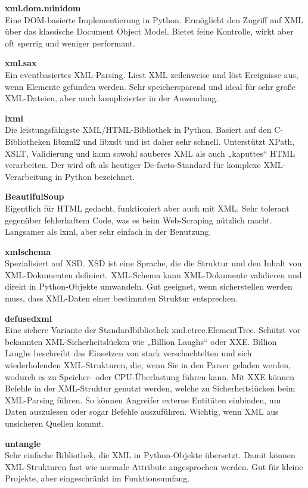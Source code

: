 \textbf{xml.dom.minidom}\\
Eine DOM-basierte Implementierung in Python.
Ermöglicht den Zugriff auf XML über das klassische Document Object Model.
Bietet feine Kontrolle, wirkt aber oft sperrig und weniger performant. \cite*{xml.dom.minidom}

\textbf{xml.sax}\\
Ein eventbasiertes XML-Parsing.
Liest XML zeilenweise und löst Ereignisse aus, wenn Elemente gefunden werden.
Sehr speichersparend und ideal für sehr große XML-Dateien, aber auch komplizierter in der Anwendung. \cite*{xml.sax}

\textbf{lxml}\\
Die leistungsfähigste XML/HTML-Bibliothek in Python.
Basiert auf den C-Bibliotheken libxml2 und libxslt und ist daher sehr schnell.
Unterstützt XPath, \ac{XSLT}, Validierung und kann sowohl sauberes XML als auch „kaputtes“ \ac{HTML} verarbeiten.
Der wird oft als heutiger De-facto-Standard für komplexe XML-Verarbeitung in Python bezeichnet. \cite*{lxml}

\textbf{BeautifulSoup}\\
Eigentlich für HTML gedacht, funktioniert aber auch mit XML. Sehr tolerant gegenüber fehlerhaftem Code, was es beim Web-Scraping nützlich macht.
Langsamer als lxml, aber sehr einfach in der Benutzung. \cite*{BeautifulSoup}

\textbf{xmlschema}\\
Spezialisiert auf \ac{XSD}.
\ac{XSD} ist eine Sprache, die die Struktur und den Inhalt von XML-Dokumenten definiert.
XML-Schema kann XML-Dokumente validieren und direkt in Python-Objekte umwandeln.
Gut geeignet, wenn sicherstellen werden muss, dass XML-Daten einer bestimmten Struktur entsprechen. \cite*{xmlschema}

\textbf{defusedxml}\\
Eine sichere Variante der Standardbibliothek xml.etree.ElementTree.
Schützt vor bekannten XML-Sicherheitslücken wie „Billion Laughs“ oder \ac{XXE}.
Billion Laughs beschreibt das Einsetzen von stark verschachtelten und sich wiederholenden \ac{XML}-Strukturen, die, wenn Sie in
den Parser geladen werden, wodurch es zu Speicher- oder CPU-Überlastung führen kann.
Mit \ac{XXE} können Befehle in der XML-Struktur genutzt werden, welche zu Sicherheitslücken beim XML-Parsing führen.
So können Angreifer externe Entitäten einbinden, um Daten auszulesen oder sogar Befehle auszuführen.
Wichtig, wenn XML aus unsicheren Quellen kommt. \cite*{defusedxml}

\textbf{untangle}\\
Sehr einfache Bibliothek, die XML in Python-Objekte übersetzt.
Damit können XML-Strukturen fast wie normale Attribute angesprochen werden.
Gut für kleine Projekte, aber eingeschränkt im Funktionsumfang. \cite*{untangle}